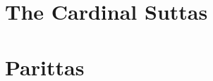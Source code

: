 \suttasPartSettings

\part{The Cardinal Suttas}

\suttasChapterSettings



\suttasSettingsRestore

\parittasPartSettings

\part{Parittas}

\parittasChapterSettings



\parittasSettingsRestore




% 



